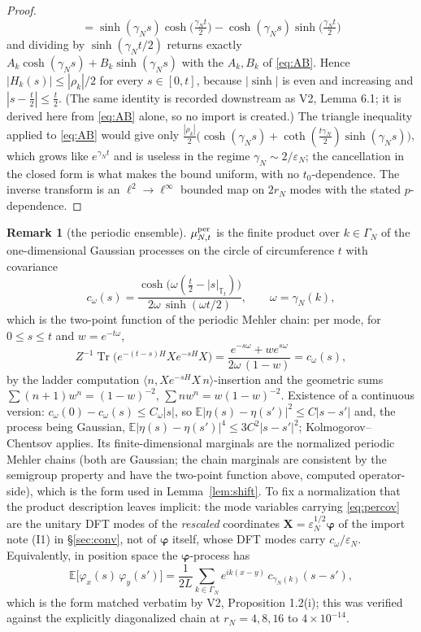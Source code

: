 \documentclass[11pt,a4paper]{article}
\theoremstyle{plain}
\theoremstyle{definition}
\newtheorem{remark}[theorem]{Remark}
\newcommand{\T}{\mathbb{T}}
\newcommand{\E}{\mathbb{E}}
\newcommand{\eps}{\varepsilon}
\newcommand{\ip}[2]{\langle #1,#2\rangle}
\DeclareMathOperator{\Trace}{Tr}
\DeclareMathOperator{\ch}{cosh}
\DeclareMathOperator{\sh}{sinh}
\DeclareMathOperator{\cth}{coth}
\begin{document}
\begin{proof}
\[ =\sh(\gamma_Ns)\ch\bigl(\tfrac{\gamma_Nt}2\bigr)
 -\ch(\gamma_Ns)\sh\bigl(\tfrac{\gamma_Nt}2\bigr)
\]
and dividing by $\sh(\gamma_Nt/2)$ returns exactly
$A_k\ch(\gamma_Ns)+B_k\sh(\gamma_Ns)$ with the $A_k,B_k$ of \eqref{eq:AB}. Hence $|H_k(s)|\le|\rho_k|/2$ for every $s\in[0,t]$, because
$|\sh|$ is even and increasing and $|s-\tfrac t2|\le\tfrac t2$. (The same
identity is recorded downstream as V2, Lemma 6.1; it is derived here from
\eqref{eq:AB} alone, so no import is created.) The triangle inequality applied to \eqref{eq:AB} would give only
$\tfrac{|\rho_k|}2\bigl(\ch(\gamma_Ns)
+\cth(\tfrac{t\gamma_N}2)\sh(\gamma_Ns)\bigr)$, which grows like
$e^{\gamma_Nt}$ and is useless in the regime $\gamma_N\sim2/\eps_N$; the
cancellation in the closed form is what makes the bound uniform, with no
$t_0$-dependence. The inverse transform is an $\ell^2\to\ell^\infty$ bounded
map on $2r_N$ modes with the stated $p$-dependence.
\end{proof}

\begin{remark}[the periodic ensemble]\label{rem:ensemble}
$\mu^{\rm per}_{N,t}$ is the finite product over $k\in\Gamma_N$ of the
one-dimensional Gaussian processes on the circle of circumference $t$ with
covariance
\begin{equation}
 c_\omega(s)=\frac{\ch\bigl(\omega(\tfrac t2-|s|_{\T_t})\bigr)}
 {2\omega\,\sh(\omega t/2)},\qquad \omega=\gamma_N(k),
 \label{eq:percov}
\end{equation}
which is the two-point function of the periodic Mehler chain: per mode, for
$0\le s\le t$ and $w=e^{-t\omega}$,
\[
 Z^{-1}\Trace\bigl(e^{-(t-s)H}Xe^{-sH}X\bigr)
 =\frac{e^{-s\omega}+we^{s\omega}}{2\omega\,(1-w)}=c_\omega(s),
\]
by the ladder computation
$\ip{n}{Xe^{-sH}X\,n}$-insertion and the geometric sums
$\sum(n{+}1)w^n=(1-w)^{-2}$, $\sum nw^n=w(1-w)^{-2}$. Existence of a
continuous version: $c_\omega(0)-c_\omega(s)\le C_\omega|s|$, so
$\E|\eta(s)-\eta(s')|^2\le C|s-s'|$ and, the process being Gaussian,
$\E|\eta(s)-\eta(s')|^4\le3C^2|s-s'|^2$; Kolmogorov--Chentsov applies. Its
finite-dimensional marginals are the normalized periodic Mehler chains (both
are Gaussian; the chain marginals are consistent by the semigroup property and
have the two-point function above, computed operator-side), which is the form
used in Lemma~\ref{lem:shift}.
To fix a normalization that the product description leaves implicit: the mode
variables carrying \eqref{eq:percov} are the unitary DFT modes of the
\emph{rescaled} coordinates $\bm X=\eps_N^{1/2}\bm\varphi$ of the
import note (I1) in \S\ref{sec:conv}, not of $\bm\varphi$ itself, whose DFT modes carry
$c_\omega/\eps_N$. Equivalently, in position space the $\bm\varphi$-process has
\[
 \E\bigl[\varphi_x(s)\,\varphi_y(s')\bigr]
 =\frac1{2L}\sum_{k\in\Gamma_N}e^{ik(x-y)}\,c_{\gamma_N(k)}(s-s'),
\]
which is the form matched verbatim by V2, Proposition 1.2(i); this was verified
against the explicitly diagonalized chain at $r_N=4,8,16$ to $4\times10^{-14}$.
\end{remark}
\end{document}
